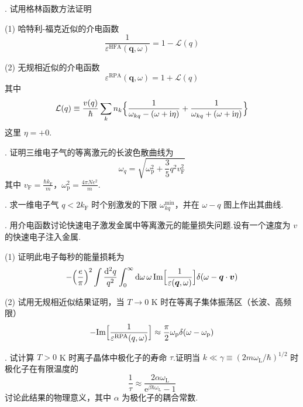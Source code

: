 {.} 试用格林函数方法证明

(1) 哈特利-福克近似的介电函数
\begin{equation*}
  \frac{1}{\varepsilon^{\mathrm{HFA}}(\boldsymbol{q},\omega)}=1-\mathcal{L}(q)
\end{equation*}

(2) 无规相近似的介电函数
\begin{equation*}
  \varepsilon^{\mathrm{RPA}}(\boldsymbol{q},\omega)=1+\mathcal{L}(q)
\end{equation*}
其中
\begin{equation*}
  \mathcal{L}(q)\equiv\frac{v(q)}{\hbar}\sum_{k}n_{k}
  \Bigl\{\frac{1}{\omega_{kq}-(\omega+\mathrm{i}\eta)}
  +\frac{1}{\omega_{kq}+(\omega+\mathrm{i}\eta)}\Bigr\}
\end{equation*}
这里 $\eta=+0$.

{.} 证明三维电子气的等离激元的长波色散曲线为
\begin{equation*}
  \omega_{q}=\sqrt{\omega_{\mathrm{p}}^{2}+\frac{3}{5}q^{2}v_{\mathrm{F}}^{2}}
\end{equation*}
其中 $v_{\mathrm{F}}=\frac{\hbar k_{\mathrm{F}}}{m}$，$\omega_{\mathrm{p}}^{2}=\frac{4\pi Ne^{2}}{m}$.

{.} 求一维电子气 $q<2k_{\mathrm{F}}$ 时个别激发的下限 $\omega_{kq}^{\min}$，并在 $\omega-q$ 图上作出其曲线.

{.} 用介电函数讨论快速电子激发金属中等离激元的能量损失问题.设有一个速度为 $v$ 的快速电子注入金属.

(1) 证明此电子每秒的能量损耗为
\begin{equation*}
  -\Bigl(\frac{e}{\pi}\Bigr)^{2}\int\frac{\mathrm{d}^{2}q}{q^{2}}\int_{0}^{\infty}\mathrm{d}\omega\,\omega\,
  \mathrm{Im}\Bigl[\frac{1}{\varepsilon(\boldsymbol{q},\omega)}\Bigr]\delta(\omega-\boldsymbol{q}\cdot\boldsymbol{v})
\end{equation*}

(2) 试用无规相近似结果证明，当 $T\to0$ K 时在等离子集体振荡区（长波、高频限）
\begin{equation*}
  -\mathrm{Im}\Bigl[\frac{1}{\varepsilon^{\mathrm{RPA}}(q,\omega)}\Bigr]\approx\frac{\pi}{2}\omega_{\mathrm{p}}\delta(\omega-\omega_{\mathrm{p}})
\end{equation*}

{.} 试计算 $T>0$ K 时离子晶体中极化子的寿命 $\tau$.证明当 $k\ll\gamma\equiv(2m\omega_{\mathrm{L}}/\hbar)^{1/2}$ 时极化子在有限温度的
\begin{equation*}
  \frac{1}{\tau}\approx\frac{2\alpha\omega_{\mathrm{L}}}{\mathrm{e}^{\beta\hbar\omega_{\mathrm{L}}}-1}
\end{equation*}
讨论此结果的物理意义，其中 $\alpha$ 为极化子的耦合常数.

